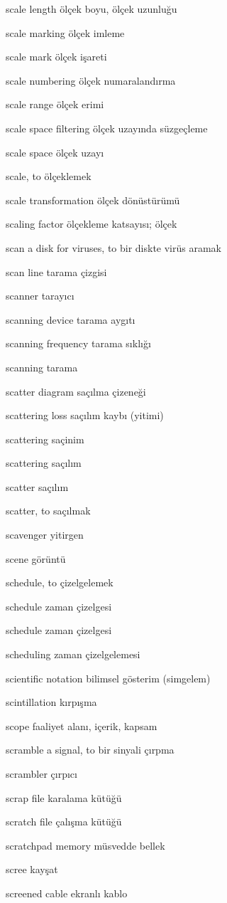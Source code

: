 \documentclass[12pt,fleqn]{article}\usepackage{../../common}
\begin{document}
scale length ölçek boyu, ölçek uzunluğu

scale marking ölçek imleme

scale mark ölçek işareti

scale numbering ölçek numaralandırma

scale range ölçek erimi

scale space filtering ölçek uzayında süzgeçleme

scale space ölçek uzayı

scale, to ölçeklemek

scale transformation ölçek dönüstürümü

scaling factor ölçekleme katsayısı; ölçek

scan a disk for viruses, to bir diskte virüs aramak

scan line tarama çizgisi

scanner tarayıcı

scanning device tarama aygıtı

scanning frequency tarama sıklığı

scanning tarama

scatter diagram saçılma çizeneği

scattering loss saçılım kaybı (yitimi)

scattering saçinim

scattering saçılım

scatter saçılım

scatter, to saçılmak

scavenger yitirgen

scene görüntü

schedule, to çizelgelemek

schedule zaman çizelgesi

schedule zaman çizelgesi

scheduling zaman çizelgelemesi

scientific notation bilimsel gösterim (simgelem)

scintillation kırpışma

scope faaliyet alanı, içerik, kapsam

scramble a signal, to bir sinyali çırpma

scrambler çırpıcı

scrap file karalama kütüğü

scratch file çalışma kütüğü

scratchpad memory müsvedde bellek

scree kayşat

screened cable ekranlı kablo
\end{document}
